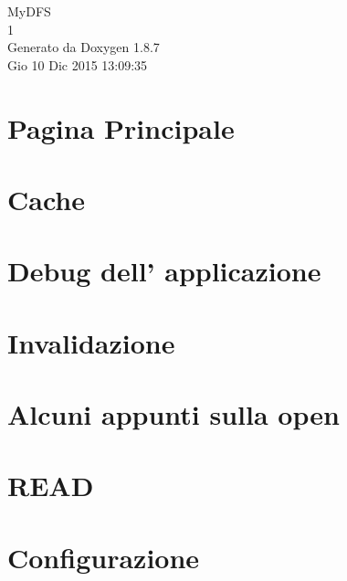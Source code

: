 \documentclass[twoside]{book}
\newcommand{\+}{\discretionary{\mbox{\scriptsize$\hookleftarrow$}}{}{}}
\newcommand{\clearemptydoublepage}{%
  \newpage{\pagestyle{empty}\cleardoublepage}%
}
\begin{document}
\hypersetup{pageanchor=false,
             bookmarks=true,
             bookmarksnumbered=true,
             pdfencoding=unicode
            }
\begin{titlepage}
\vspace*{7cm}
\begin{center}%
{\Large My\+D\+F\+S \\[1ex]\large 1 }\\
\vspace*{1cm}
{\large Generato da Doxygen 1.8.7}\\
\vspace*{0.5cm}
{\small Gio 10 Dic 2015 13:09:35}\\
\end{center}
\end{titlepage}
\clearemptydoublepage
\tableofcontents
\clearemptydoublepage
{}
\hypersetup{pageanchor=true}

\chapter{Pagina Principale}
\label{index}\hypertarget{index}{}
\chapter{Cache}
\label{md_Cache}
\hypertarget{md_Cache}{}

\chapter{Debug dell' applicazione}
\label{md_DEBUG}
\hypertarget{md_DEBUG}{}

\chapter{Invalidazione}
\label{md_Invalidazione}
\hypertarget{md_Invalidazione}{}

\chapter{Alcuni appunti sulla open}
\label{md_OPE}
\hypertarget{md_OPE}{}

\chapter{R\+E\+A\+D}
\label{md_READ}
\hypertarget{md_READ}{}

\chapter{Configurazione}
\label{md_Test}
\hypertarget{md_Test}{}

\end{document}
